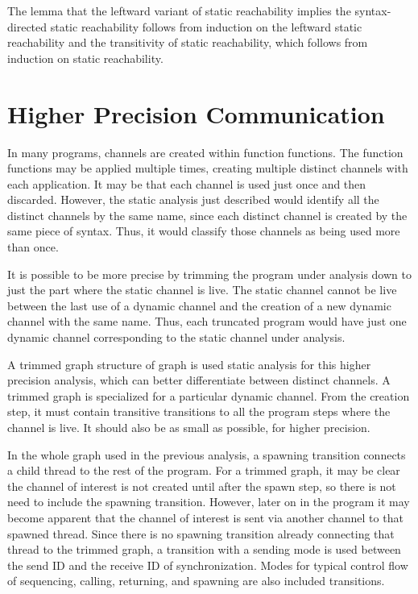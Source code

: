 \documentclass[10pt]{article}
\begin{document}
The lemma that the leftward variant of static reachability implies the syntax-directed static
reachability follows from induction on the leftward static reachability and the
transitivity of static
reachability, which follows from induction on static reachability.

\section{Higher Precision Communication}
In many programs, channels are created within function functions.  The function functions
may be applied multiple times, creating multiple distinct channels with each application.
It may be that each channel is used just once and then discarded.  However, the static
analysis just described would identify all the distinct channels by the same name, since each
distinct channel is created by the same piece of syntax. Thus, it would classify those channels
as being used more than once.

It is possible to be more precise by trimming the program under analysis down to just the part
where the static channel is live. The static channel cannot be live between the last use of a
dynamic channel and the creation of a new dynamic channel with the same name.  Thus, each
truncated program would have just one dynamic channel corresponding to the static channel under
analysis. 

A trimmed graph structure of graph is used static analysis for this higher precision
analysis, which can better differentiate between distinct channels. 
A trimmed graph is specialized for a particular dynamic channel.  From the creation
step, it must contain transitive transitions to all the program steps where the
channel is live. It should also be as small as possible, for higher precision.

In the whole graph used in the previous analysis, a spawning transition
connects a child thread to the rest of the program.  For a trimmed graph,
it may be clear the channel of interest is not created until after the spawn step,
so there is not need to include the spawning transition.  However, later on in the
program it may become apparent that the channel of interest is sent via another channel to
that spawned thread.  Since there is no spawning transition already connecting that
thread to the trimmed graph, a transition with a sending mode is used between the
send ID and the receive ID of synchronization. Modes for typical control flow of
sequencing, calling, returning, and spawning are also included transitions.
\end{document}
